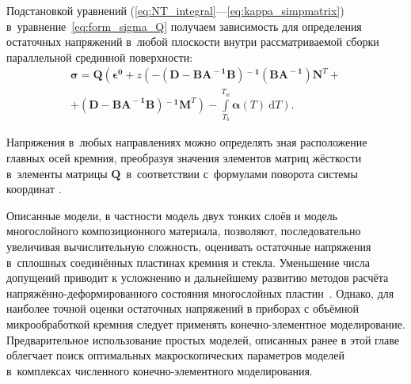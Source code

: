 Подстановкой уравнений (\ref{eq:NT_integral}---\ref{eq:kappa_simpmatrix}) %
в~уравнение~\eqref{eq:form_sigma_Q} получаем зависимость для определения
остаточных напряжений в~любой плоскости внутри рассматриваемой сборки
параллельной срединной поверхности:
\begin{multline*}
    \boldsymbol{\sigma}
    =
    \mathbf{Q}
    \left(
        \boldsymbol{\epsilon^0}
        +
        z
        \left(
            -
            (\mathbf{D} - \mathbf{B A^{\!\!-1}B})\mathbf{{}^{\!-1}} %
            (\mathbf{B A^{\!\!-1}}) %
            \mathbf{N}^T
            \right.\right. %
            + \\ +
            \left. %
            (\mathbf{D} - \mathbf{B A^{\!\!-1}B})\mathbf{{}^{\!-1}} %
            \mathbf{M}^T
        \right)
        -
        \int\limits_{T_{b}}^{T_{w}}
        \left. %
        \boldsymbol{\alpha}(T)\:\mathrm{d}T
    \right).
\end{multline*}

Напряжения в~любых направлениях можно определять зная расположение главных осей
кремния, преобразуя значения элементов матриц жёсткости в~элементы матрицы
$\mathbf{Q}$~в~соответствии с~формулами поворота системы координат \cites[С.~18,~215,~224]{Alfutov1984_povorot_matric}.

Описанные модели, в частности модель двух тонких слоёв и модель
многослойного композиционного материала, позволяют, последовательно
увеличивая вычислительную сложность, оценивать остаточные напряжения
в~сплошных соединённых пластинах кремния и стекла. Уменьшение числа допущений
приводит к усложнению и дальнейшему развитию методов расчёта
напряжённо\nb-деформированного состояния многослойных
пластин~\cites[С.~165,~170]{kristensen1982_per_Vved_v_kompozit}{bitkina2013_avtoref}.
Однако, для наиболее точной оценки
остаточных напряжений в приборах с объёмной микрообработкой кремния
следует применять конечно-элементное
моделирование. Предварительное использование простых моделей, описанных
ранее в этой главе облегчает поиск оптимальных макроскопических параметров
моделей в~комплексах численного конечно-элементного моделирования.

